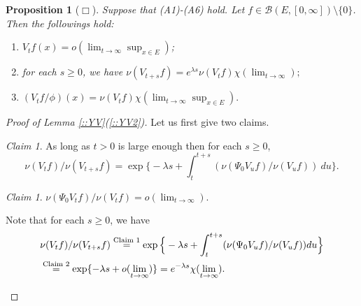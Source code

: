 \documentclass[12pt,a4paper]{amsart}
\numberwithin{equation}{section}
\theoremstyle{plain}
\newtheorem{prop}[thm]{Proposition}
\theoremstyle{definition}
\theoremstyle{remark}
\newtheorem{claim}[thm]{Claim}
\newenvironment{proof*}[1][\proofname]{
  \renewcommand\qedsymbol{$\blacksquare$}
  \begin{proof}[#1]}{\end{proof}}
\begin{document}
  \begin{prop}[$\Box$] \label{::YV'} Suppose that (A1)-(A6) hold. Let $f\in \mathcal B(E, [0,\infty])\setminus \{0\}$. Then the followings hold:
    \begin{enumerate}
    \item \label{::YV'1} $  V_tf(x) = o(\lim_{t\to \infty} \sup_{x\in E})$;
    \item \label{::YV'2} for each $s\geq 0$, we have $ \nu(V_{t+s}f) = e^{\lambda s} \nu(V_tf) \chi(\lim_{t\to \infty});$
    \item \label{::YV'3}$(V_tf/\phi)(x) = \nu (V_tf) \chi(\lim_{t\to \infty} \sup_{x\in E}).$
    \end{enumerate}
  \end{prop}
 

\begin{proof}[Proof of Lemma \ref{::YV}(\ref{::YV2})] 
  Let us first give two claims.
  
  \begin{claim} \label{clm:PSI}
    As long as $t>0$ is large enough then for each $s\geq 0$,
    \[
      \nu (V_tf) / \nu (V_{t+s}f) 
      = \exp\Big\{ -\lambda s +  \int_t^{t+s} (\nu (\Psi_0 V_u f)/ \nu (V_uf)) ~du \Big\}.
    \]
  \end{claim}  

  \begin{claim} \label{clm:PSR}
    $ \nu(\Psi_0 V_t f) / \nu (V_t f) = o(\lim_{t\to \infty})$.
  \end{claim}

  \begin{proof*} 
    Note that for each $s\geq 0$, we have
 \begin{align}
    & \nu (V_tf) / \nu (V_{t+s}f) 
     \overset{\text{Claim 1}} = \exp\Big\{ -\lambda s +  \int_t^{t+s} (\nu (\Psi_0 V_u f) / \nu (V_uf) ) du \Big\}  
    \\ & \overset{\text{Claim 2}} = \exp\{ -\lambda s +  o(\lim_{t\to \infty}) \}
         =  e^{- \lambda s} \chi(\lim_{t\to \infty}).
         \qedhere
\end{align}
\end{proof*}


\end{proof}
\end{document}
